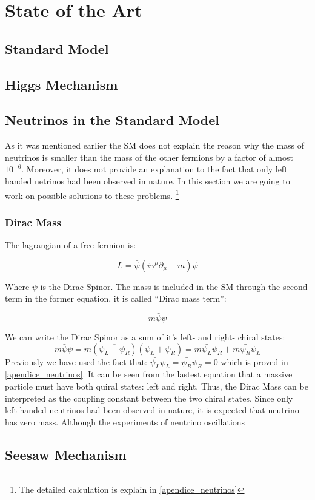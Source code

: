 \chapter{State of the Art} 

\section{Standard Model}

\section{Higgs Mechanism}

\section{Neutrinos in the Standard Model}

As it was mentioned earlier the SM does not explain the reason why the mass of neutrinos is smaller than the mass of the other fermions by a factor of almost $10^{-6}$. Moreover, it does not
provide an explanation to the fact that only left handed netrinos had been observed in nature. 
In this section we are going to work on possible solutions to these problems. \footnote{The detailed calculation is explain in \ref{apendice_neutrinos}}

\subsection{Dirac Mass}
The lagrangian of a free fermion is:

\begin{equation}
 L = \bar{\psi} \left( i \gamma ^\mu \partial_{\mu} - m \right) \psi
\end{equation}

Where $\psi$ is the Dirac Spinor. The mass is included in the SM through the second term in the former equation, it is called ``Dirac mass term'':

\begin{equation}
 m \bar{\psi} \psi
\end{equation}

We can write the Dirac Spinor as a sum of it's left- and right- chiral states:
\begin{equation}
 m \bar{\psi} \psi = m \left( \overbar{\psi_L + \psi_R} \right) \left( \psi_L + \psi_R \right) = m \bar{\psi_L} \psi_R + m \bar{\psi_R}\psi_L
\end{equation}
Previously we have used the fact that: $\bar{\psi_L}\psi_L = \bar{\psi_R}\psi_R = 0$ which is proved in \ref{apendice_neutrinos}. It can be seen from the lastest equation
that a massive particle must have both quiral states: left and right. Thus, the Dirac Mass can be interpreted as the coupling constant between the two chiral states. Since only left-handed 
neutrinos had been observed in nature, it is expected that neutrino has zero mass. Although the experiments of neutrino oscillations 




\section{Seesaw Mechanism}

